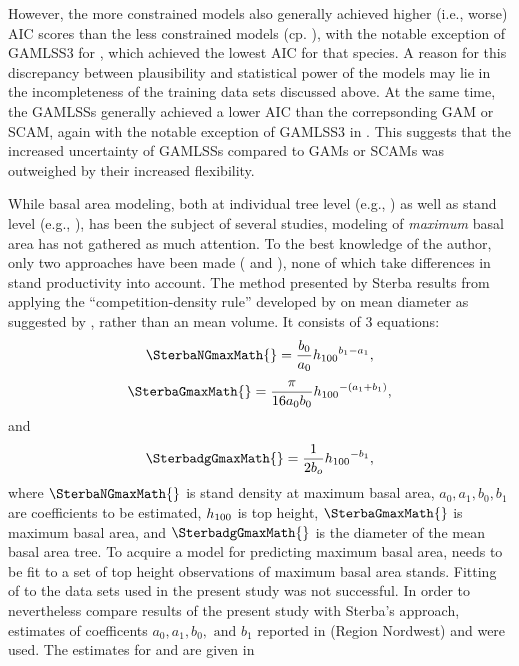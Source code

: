 However, the more constrained models also generally achieved higher (i.e., worse) AIC scores than the less constrained models (cp. ), with the notable exception of GAMLSS3 for \Spruce{}, which achieved the lowest AIC for that species.  A reason for this discrepancy between plausibility and statistical power of the models may lie in the incompleteness of the training data sets discussed above.  At the same time, the GAMLSSs generally achieved a lower AIC than the correpsonding GAM or SCAM, again with the notable exception of GAMLSS3 in \Spruce{}.  This suggests that the increased uncertainty of GAMLSSs compared to GAMs or SCAMs was outweighed by their increased flexibility.

While basal area modeling, both at individual tree level (e.g., \textcite{Andreassen2003,Hein2006,Jogiste2000,Monserud1996,Nystroem1997,Schroeder2002,Wimberly1996}) as well as stand level (e.g., \textcite{Castedo-Dorado2007,Chikumbo2001,Chikumbo1999,Eerikaeinen2003}), has been the subject of several studies, modeling of \emph{maximum} basal area has not gathered as much attention.  To the best knowledge of the author, only two approaches have been made (\textcite{Sterba1975,Sterba1987,Sterba1981} and \textcite{Woerdehoff2016}), none of which take differences in stand productivity into account.   The method presented by Sterba results from applying the “competition-density rule” developed by \textcite{Kira1953,Ando1968,Ando1968a,Tadaki1963} on mean diameter as suggested by \textcite{Goulding1972}, rather than an mean volume.  It consists of 3 equations:
\begin{equation}
  \label{eq:SterbaNGmax}
  \SterbaNGmaxMath{} = \frac{b_0}{a_0} \TopHeightMath{} ^ {b_1 - a_1},
\end{equation}
\begin{equation}
  \label{eq:SterbaGmax}
  \SterbaGmaxMath{} = \frac{\pi}{16 a_0 b_0} \TopHeightMath{} ^ {-(a_1 + b_1)},
\end{equation}
and
\begin{equation}
  \label{eq:SterbadgGmax}
  \SterbadgGmaxMath{} = \frac{1}{2 b_o} \TopHeightMath{} ^ {-b_1},
\end{equation}
where \(\SterbaNGmaxMath{}\) is stand density at maximum basal area, \(a_0, a_1, b_0, b_1\) are coefficients to be estimated, \(h_{100}{}\) is top height, \(\SterbaGmaxMath{}\) is maximum basal area, and \(\SterbadgGmaxMath{}\) is the diameter of the mean basal area tree.  To acquire a model for predicting maximum basal area,  needs to be fit to a set of top height observations of maximum basal area stands.  Fitting of  to the data sets used in the present study was not successful.  In order to nevertheless compare results of the present study with Sterba’s approach, estimates of coefficents \(a_0, a_1, b_0, \text{ and } b_1\) reported in \textcite{Doebbeler2004} (Region Nordwest) and \textcite{Woerdehoff2016} were used.  The estimates for \Beech{} and \Spruce{} are given in 

